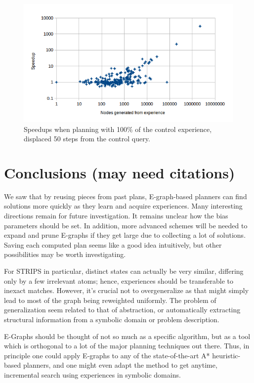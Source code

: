 \documentclass[letterpaper]{article}
\begin{document}
\begin{figure}
	\begin{center}
	\includegraphics[scale=0.5]{Speedup_100_50.png}
	\end{center}
	\caption{Speedups when planning with 100\% of the control experience, displaced 50 steps from the control query.}
	 \label{fig:s_100_50}
\end{figure}

\section{Conclusions (may need citations)}

We saw that by reusing pieces from past plans, E-graph-based planners can find solutions more quickly as they learn and acquire experiences. Many interesting directions remain for future investigation. It remains unclear how the bias parameters should be set. In addition, more advanced schemes will be needed to expand and prune E-graphs if they get large due to collecting a lot of solutions. Saving each computed plan seems like a good idea intuitively, but other possibilities may be worth investigating.

For STRIPS in particular, distinct states can actually be very similar, differing only by a few irrelevant atoms; hence, experiences should be transferable to inexact matches. However, it's crucial not to overgeneralize as that might simply lead to most of the graph being reweighted uniformly. The problem of generalization seem related to that of abstraction, or automatically extracting structural information from a symbolic domain or problem description.

E-Graphs should be thought of not so much as a specific algorithm, but as a tool which is orthogonal to a lot of the major planning techniques out there. Thus, in principle one could apply E-graphs to any of the state-of-the-art A* heuristic-based planners, and one might even adapt the method to get anytime, incremental search using experiences in symbolic domains.
\end{document}
